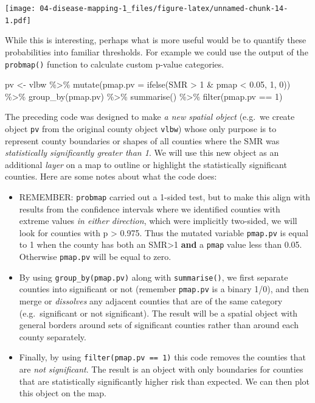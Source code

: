 \documentclass[
]{book}
\newenvironment{Shaded}{\begin{snugshade}}{\end{snugshade}}
\newcommand{\AttributeTok}[1]{\textcolor[rgb]{0.77,0.63,0.00}{#1}}
\newcommand{\DecValTok}[1]{\textcolor[rgb]{0.00,0.00,0.81}{#1}}
\newcommand{\FloatTok}[1]{\textcolor[rgb]{0.00,0.00,0.81}{#1}}
\newcommand{\FunctionTok}[1]{\textcolor[rgb]{0.00,0.00,0.00}{#1}}
\newcommand{\NormalTok}[1]{#1}
\newcommand{\OtherTok}[1]{\textcolor[rgb]{0.56,0.35,0.01}{#1}}
\newcommand{\SpecialCharTok}[1]{\textcolor[rgb]{0.00,0.00,0.00}{#1}}
\providecommand{\tightlist}{%
  \setlength{\itemsep}{0pt}\setlength{\parskip}{0pt}}
\begin{document}
\texttt{[image: 04-disease-mapping-1\_files/figure-latex/unnamed-chunk-14-1.pdf]}

While this is interesting, perhaps what is more useful would be to quantify these probabilities into familiar thresholds. For example we could use the output of the \texttt{probmap()} function to calculate custom p-value categories.

\begin{Shaded}
\begin{Highlighting}[]
\NormalTok{pv }\OtherTok{\textless{}{-}}\NormalTok{ vlbw }\SpecialCharTok{\%\textgreater{}\%}
  \FunctionTok{mutate}\NormalTok{(}\AttributeTok{pmap.pv =} \FunctionTok{ifelse}\NormalTok{(SMR }\SpecialCharTok{\textgreater{}} \DecValTok{1} \SpecialCharTok{\&}\NormalTok{ pmap }\SpecialCharTok{\textless{}} \FloatTok{0.05}\NormalTok{, }\DecValTok{1}\NormalTok{, }\DecValTok{0}\NormalTok{)) }\SpecialCharTok{\%\textgreater{}\%}
  \FunctionTok{group\_by}\NormalTok{(pmap.pv) }\SpecialCharTok{\%\textgreater{}\%}
  \FunctionTok{summarise}\NormalTok{() }\SpecialCharTok{\%\textgreater{}\%}
  \FunctionTok{filter}\NormalTok{(pmap.pv }\SpecialCharTok{==} \DecValTok{1}\NormalTok{)}
\end{Highlighting}
\end{Shaded}

The preceding code was designed to make \emph{a new spatial object} (e.g.~we create object \texttt{pv} from the original county object \texttt{vlbw}) whose only purpose is to represent county boundaries or shapes of all counties where the SMR was \emph{statistically significantly greater than 1}. We will use this new object as an additional \emph{layer} on a map to outline or highlight the statistically significant counties. Here are some notes about what the code does:

\begin{itemize}
\tightlist
\item
  REMEMBER: \texttt{probmap} carried out a 1-sided test, but to make this align with results from the confidence intervals where we identified counties with extreme values \emph{in either direction}, which were implicitly two-sided, we will look for counties with p \textgreater{} 0.975. Thus the mutated variable \texttt{pmap.pv} is equal to 1 when the county has both an SMR\textgreater1 \textbf{and} a \texttt{pmap} value less than 0.05. Otherwise \texttt{pmap.pv} will be equal to zero.
\item
  By using \texttt{group\_by(pmap.pv)} along with \texttt{summarise()}, we first separate counties into significant or not (remember \texttt{pmap.pv} is a binary 1/0), and then merge or \emph{dissolves} any adjacent counties that are of the same category (e.g.~significant or not significant). The result will be a spatial object with general borders around sets of significant counties rather than around each county separately.
\item
  Finally, by using \texttt{filter(pmap.pv\ ==\ 1)} this code removes the counties that are \emph{not significant}. The result is an object with only boundaries for counties that are statistically significantly higher risk than expected. We can then plot this object on the map.
\end{itemize}
\end{document}
